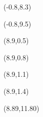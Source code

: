 \begin{titlepage}
\color{white}
\sffamily\small

\begin{textblock}{10}(-0.8,8.3)
	\parTa{\textbf{\docTitle}}
\end{textblock}

\begin{textblock}{10}(-0.8,9.5)
	\parTb{\docSubTitle}
\end{textblock}

\newcommand{\creatorX}{8.9}

\begin{textblock}{10}(\creatorX,0.5)
	\parTc{\textbf{}}
\end{textblock}

\begin{textblock}{10}(\creatorX,0.8)
	\parTc{\docCreater}
\end{textblock}

\begin{textblock}{10}(\creatorX,1.1)
	\parTc{\docCreaterID}
\end{textblock}

\begin{textblock}{10}(\creatorX,1.4)
	\parTc{\docCreatorMail}
\end{textblock}

\begin{textblock}{10}(8.89,11.80)
	\parTc{\textbf{\docLocation , \docDate}}	
\end{textblock}

\clearpage


\color{black}


\end{titlepage}

